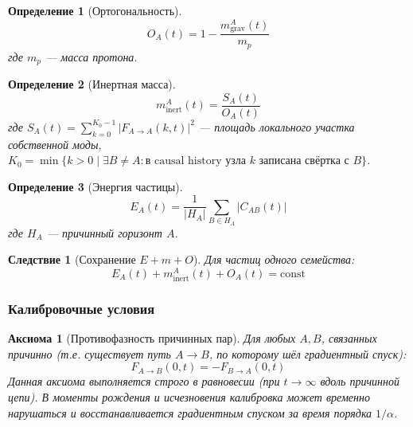 \documentclass[12pt,a4paper]{article}
\newtheorem{definition}{Определение}[section]
\newtheorem{axiom}{Аксиома}[section]
\newtheorem{corollary}{Следствие}[section]
\begin{document}
\begin{definition}[Ортогональность]
\begin{equation}
    O_A(t) = 1 - \frac{m_{\text{grav}}^A(t)}{m_p}
\end{equation}
где $m_p$ --- масса протона.
\end{definition}

\begin{definition}[Инертная масса]
\begin{equation}
    m_{\text{inert}}^A(t) = \frac{S_A(t)}{O_A(t)}
\end{equation}
где $S_A(t) = \sum_{k=0}^{K_0-1} |F_{A \to A}(k, t)|^2$ --- площадь локального участка собственной моды,
$K_0 = \min\{k > 0 \mid \exists B \neq A: \text{в causal history узла } k \text{ записана свёртка с } B\}$.
\end{definition}

\begin{definition}[Энергия частицы]
\begin{equation}
    E_A(t) = \frac{1}{|H_A|} \sum_{B \in H_A} |C_{AB}(t)|
\end{equation}
где $H_A$ --- причинный горизонт $A$.
\end{definition}

\begin{corollary}[Сохранение $E + m + O$]
Для частиц одного семейства:
\begin{equation}
    E_A(t) + m_{\text{inert}}^A(t) + O_A(t) = \text{const}
\end{equation}
\end{corollary}

\subsubsection{Калибровочные условия}

\begin{axiom}[Противофазность причинных пар]
Для любых $A, B$, связанных причинно (т.е. существует путь $A \to B$, по которому шёл градиентный спуск):
\begin{equation}
    F_{A \to B}(0, t) = -F_{B \to A}(0, t)
\end{equation}
Данная аксиома выполняется строго в равновесии (при $t \to \infty$ вдоль причинной цепи). В моменты рождения и исчезновения калибровка может временно нарушаться и восстанавливается градиентным спуском за время порядка $1/\alpha$.
\end{axiom}
\end{document}
